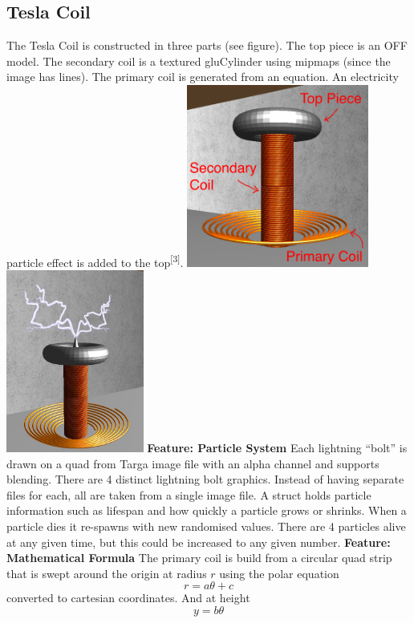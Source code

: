 \documentclass[10pt, oneside]{article}   	%
\begin{document}
\subsection{Tesla Coil}
The Tesla Coil is constructed in three parts (see figure).  The top piece is an OFF model.  The secondary coil is a textured gluCylinder using mipmaps (since the image has lines).  The primary coil is generated from an equation.  An electricity particle effect is added to the top\textsuperscript{[3]}.
\vspace{2mm}
\newline
\includegraphics[height=6cm]{coil1.png} \hspace{30mm} \includegraphics[height=6cm]{coil2.jpg}   %
\newline
\newline
\textbf{Feature: Particle System}\hspace{3mm} Each lightning ``bolt'' is drawn on a quad from Targa image file with an alpha channel and supports blending.  There are 4 distinct lightning bolt graphics.  Instead of having separate files for each, all are taken from a single image file.  A struct holds particle information such as lifespan and how quickly a particle grows or shrinks.  When a particle dies it re-spawns with new randomised values.  There are 4 particles alive at any given time, but this could be increased to any given number.
\newline
\newline
\textbf{Feature: Mathematical Formula}\hspace{3mm} The primary coil is build from a circular quad strip that is swept around the origin at radius $r$ using the polar equation
\begin{equation}
r = a\theta + c
\end{equation}
converted to cartesian coordinates.  And at height
\begin{equation}
y = b\theta
\end{equation}
\end{document}
